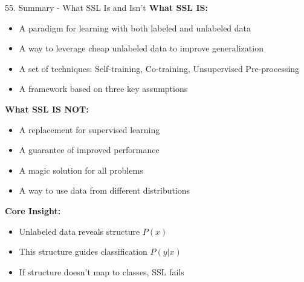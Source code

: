\documentclass[8pt]{beamer}
\begin{document}
	
	\begin{frame}{55. Summary - What SSL Is and Isn't}
		\fontsize{6.5}{7.5}\selectfont
		\textbf{What SSL IS:}
		\begin{itemize}
			\item A paradigm for learning with both labeled and unlabeled data
			\item A way to leverage cheap unlabeled data to improve generalization
			\item A set of techniques: Self-training, Co-training, Unsupervised Pre-processing
			\item A framework based on three key assumptions
		\end{itemize}
		
		\textbf{What SSL IS NOT:}
		\begin{itemize}
			\item A replacement for supervised learning
			\item A guarantee of improved performance
			\item A magic solution for all problems
			\item A way to use data from different distributions
		\end{itemize}
		
		\textbf{Core Insight:}
		\begin{itemize}
			\item Unlabeled data reveals structure $P(x)$
			\item This structure guides classification $P(y|x)$
			\item If structure doesn't map to classes, SSL fails
		\end{itemize}
	\end{frame}
	
\end{document}
